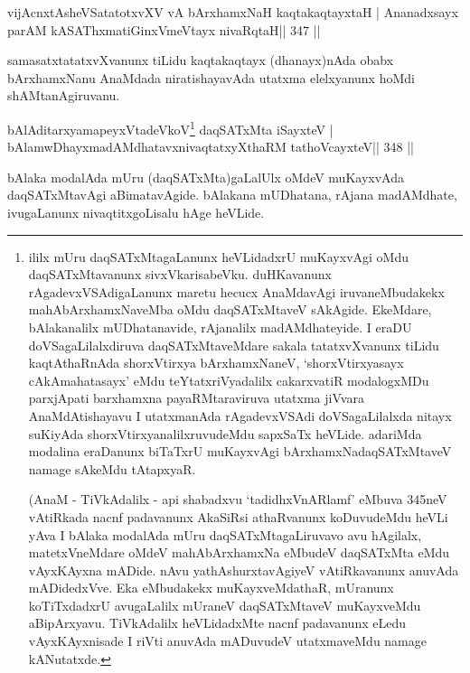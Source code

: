
\begin{shl}
vijAcnxtAsheVSatatotxvXV vA bArxhamxNaH kaqtakaqtayxtaH |
Ananadxsayx parAM kASAThxmatiGinxVmeVtayx nivaRqtaH\hfill || 347 ||
\end{shl}

\begin{artha}
samasatxtatatxvXvanunx tiLidu kaqtakaqtayx (dhanayx)nAda obabx bArxhamxNanu AnaMdada niratishayavAda utatxma elelxyanunx hoMdi shAMtanAgiruvanu.
\end{artha}


\begin{shl}
bAlAditarxyamapeyxVtadeVkoV\footnote{ililx mUru daqSATxMtagaLanunx heVLidadxrU muKayxvAgi  oMdu daqSATxMtavanunx sivxVkarisabeVku. duHKavanunx  rAgadevxVSAdigaLanunx maretu hecucx AnaMdavAgi iruvaneMbudakekx  mahAbArxhamxNaveMba oMdu daqSATxMtaveV sAkAgide. EkeMdare, bAlakanalilx  mUDhatanavide, rAjanalilx madAMdhateyide. I eraDU doVSagaLilalxdiruva  daqSATxMtaveMdare sakala tatatxvXvanunx tiLidu kaqtAthaRnAda shorxVtirxya  bArxhamxNaneV, `shorxVtirxyasayx cAkAmahatasayx' eMdu  teYtatxriVyadalilx cakarxvatiR modalogxMDu parxjApati barxhamxna  payaRMtaraviruva utatxma jiVvara AnaMdAtishayavu I utatxmanAda  rAgadevxVSAdi doVSagaLilalxda nitayx suKiyAda shorxVtirxyanalilxruvudeMdu sapxSaTx heVLide. adariMda modalina eraDanunx biTaTxrU muKayxvAgi bArxhamxNadaqSATxMtaveV namage sAkeMdu tAtapxyaR. 

(AnaM - TiVkAdalilx - api shabadxvu `tadidhxVnARlamf' eMbuva 345neV  vAtiRkada nacnf padavanunx AkaSiRsi athaRvanunx koDuvudeMdu heVLi yAva  I bAlaka modalAda mUru daqSATxMtagaLiruvavo avu hAgilalx,  matetxVneMdare oMdeV mahAbArxhamxNa eMbudeV daqSATxMta eMdu vAyxKAyxna  mADide. nAvu yathAshurxtavAgiyeV vAtiRkavanunx anuvAda mADidedxVve. Eka  eMbudakekx muKayxveMdathaR, mUranunx koTiTxdadxrU avugaLalilx mUraneV  daqSATxMtaveV muKayxveMdu aBipArxyavu. TiVkAdalilx heVLidadxMte nacnf  padavanunx eLedu vAyxKAyxnisade I riVti anuvAda mADuvudeV utatxmaveMdu namage kANutatxde.} daqSATxMta iSayxteV |
bAlamwDhayxmadAMdhatavxnivaqtatxyXthaRM tathoVcayxteV\hfill || 348 ||
\end{shl}

\begin{artha}
bAlaka modalAda mUru (daqSATxMta)gaLalUlx oMdeV muKayxvAda  daqSATxMtavAgi aBimatavAgide. bAlakana mUDhatana, rAjana madAMdhate, ivugaLanunx nivaqtitxgoLisalu hAge heVLide.
\end{artha}

